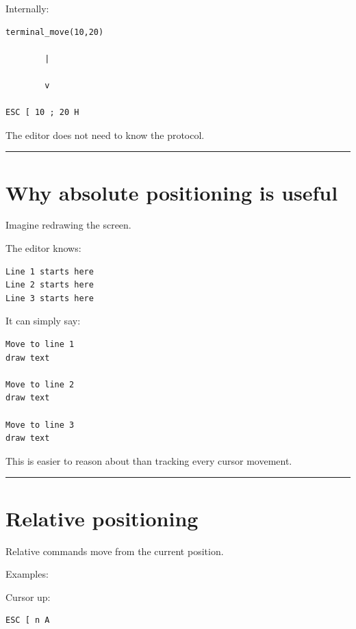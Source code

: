 \documentclass[
  oneside,
  openany]{book}
\begin{document}
Internally:

\begin{verbatim}
terminal_move(10,20)

        |

        v

ESC [ 10 ; 20 H
\end{verbatim}

The editor does not need to know the protocol.

\begin{center}\rule{0.5\linewidth}{0.5pt}\end{center}

\hypertarget{why-absolute-positioning-is-useful}{%
\section{Why absolute positioning is
useful}\label{why-absolute-positioning-is-useful}}

Imagine redrawing the screen.

The editor knows:

\begin{verbatim}
Line 1 starts here
Line 2 starts here
Line 3 starts here
\end{verbatim}

It can simply say:

\begin{verbatim}
Move to line 1
draw text

Move to line 2
draw text

Move to line 3
draw text
\end{verbatim}

This is easier to reason about than tracking every cursor movement.

\begin{center}\rule{0.5\linewidth}{0.5pt}\end{center}

\hypertarget{relative-positioning}{%
\section{Relative positioning}\label{relative-positioning}}

Relative commands move from the current position.

Examples:

Cursor up:

\begin{verbatim}
ESC [ n A
\end{verbatim}
\end{document}
